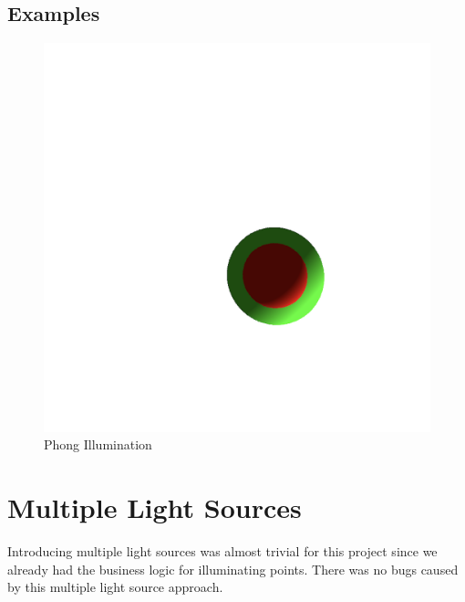 \documentclass{article}
\begin{document}
\subsection{Examples}
\begin{centering}
\begin{figure}[H]
\includegraphics[width=1\textwidth]{./images/phong.png}
\caption{Phong Illumination}
\label{fig:phong}
\end{figure}
\end{centering}

\newpage

\section{Multiple Light Sources}
\label{multiple-ls}
Introducing multiple light sources was almost trivial for this project since we already had the business logic for illuminating points. There was no bugs caused by this multiple light source approach.
\end{document}
